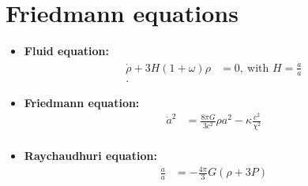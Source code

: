 \documentclass{beamer}
\begin{document}
\section{Friedmann equations}
\begin{frame}
\begin{itemize}
\frametitle{\insertsectionhead}

\item \textbf{Fluid equation:}
\begin{equation}\label{eq:6}
\begin{split}
\dot{\rho}+3H\left(1+\omega\right)\rho &= 0,\ \text{with } H=\frac{\dot{a}}{a}\\.
\end{split}
\end{equation}
\item \textbf{Friedmann equation:}
\begin{equation}
\begin{split}\label{eq:CurvFriedman}
\dot{a}^{2} &= \frac{8\pi G}{3c^{2}}\rho a^{2}-\kappa\frac{c^{2}}{\chi^{2}}\\
\end{split}
\end{equation}
\item \textbf{Raychaudhuri equation:}
\begin{equation}\label{eq:RayEq}
\begin{split}
\frac{\ddot{a}}{a} &= -\frac{4\pi}{3}G\left(\rho +3P\right)\\
\end{split}
\end{equation}

\end{itemize}
\end{frame}
\end{document}
